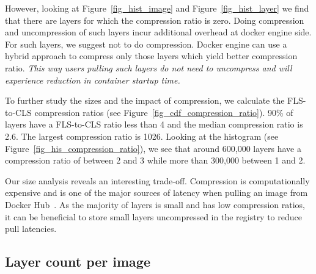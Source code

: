 However, looking at Figure~\ref{fig_hist_image} and Figure~\ref{fig_hist_layer}
we find that there are layers for which the compression ratio is zero. Doing
compression and uncompression of such layers incur additional overhead at
docker engine side.  For such layers, we suggest not to do compression.
Docker engine can use a hybrid approach to compress
only those layers which yield better compression ratio. 
\emph{This way users pulling such layers do not need to uncompress
and will experience reduction in container startup time.}


To further study the sizes and the impact of compression, we calculate the
FLS-to-CLS compression ratios (see Figure~\ref{fig_cdf_compression_ratio}).
%
%
90\% of layers have a  FLS-to-CLS ratio less than 4 and the median compression
ratio is 2.6. The largest compression ratio is 1026.
%
%
%
%
Looking at the histogram (see Figure~\ref{fig_his_compression_ratio}), we see
that around 600,000 layers have a compression ratio of between 2 and 3 while
more than 300,000 between 1 and 2.
%

Our size analysis reveals an interesting trade-off. Compression is
computationally expensive and is one of the major sources of latency when
pulling an image from Docker Hub~\cite{slacker}.  As the majority of layers is
small and has low compression ratios, it can be beneficial to store small
layers uncompressed in the registry to reduce pull latencies.

\subsection{Layer count per image}

